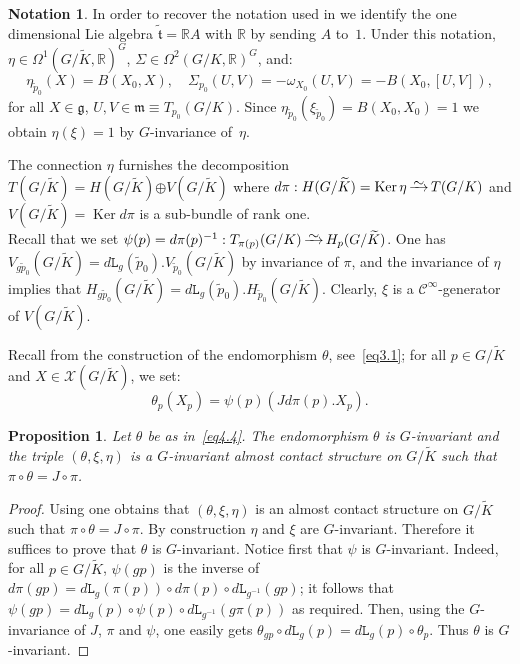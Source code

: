\documentclass[a4paper,reqno]{amsart}
\newtheorem{prop}[thm]{Proposition}
\theoremstyle{definition}
\newtheorem{Notation}[thm]{Notation}
\theoremstyle{remark}
\theoremstyle{plain}
\numberwithin{equation}{section}
\newcommand{\R}{{\mathbb{R}}}
\newcommand{\calX}{{\mathcal{X}}}
\newcommand{\calC}{{\mathcal{C}}}
\newcommand{\g}{{\mathfrak{g}}}  %
\newcommand{\fm}{{\mathfrak{m}}}
\def\preisomto{\vbox{\hbox to
               14pt{\hfill$\sim$\hfill}\nointerlineskip\vskip -0.2pt
               \hbox to 14pt{\rightarrowfill}}}
\def\isomto{\mathop{\preisomto}}
\def\Ker{\operatorname {Ker}}
\def\boplus{\mathbin{\boldsymbol{\oplus}}}
\newcommand{\Kt}{{\widetilde{K}}}
\newcommand{\wt}{{\widetilde{\mathfrak{t}}}}
\newcommand{\wpzero}{{\tilde{p}_0}}
\newcommand{\pzero}{{p_0}}
\newcommand{\ltr}{\mathtt{L}}
\newcommand{\ACS}{almost contact structure\xspace}
\newcommand{\txe}{{(\theta,\xi,\eta)}}
\begin{document}
 \begin{Notation}
   \label{not4.3}
   In order to recover the notation used in \cite{Hat, Mor1,
     Mor2, Ogi} %
   we identify the one dimensional Lie algebra $\wt= \R A$ with
   $\R$ by sending $A$ to~$1$. Under this notation,
   $\eta \in \Omega^1(G/\Kt,\R)^G$, $\Sigma \in \Omega^2(G/K,\R)^G$,
   and:
   \begin{equation*}
     \label{eq4.3}
     \eta_\wpzero(X)= B(X_0,X), \quad \Sigma_\pzero(U,V) =
     -\omega_{X_0}(U,V) = - B(X_0,[U,V]),
   \end{equation*}
   for all $X \in \g$, $U,V \in \fm \equiv T_\pzero (G/K)$.
     Since $\eta_\wpzero(\xi_\wpzero) = B(X_0,X_0) = 1$
   we obtain  $\eta(\xi)= 1$ by $G$-invariance of~$\eta$.
 \end{Notation}

 
 The connection $\eta$ furnishes the decomposition $T(G/\Kt)= H(G/\Kt) \boplus V(G/\Kt)$ where
 $d\pi : H(G/\Kt) = \Ker \eta \isomto T(G/K)$ and $V(G/\Kt)= \Ker d\pi$ is
 a sub-bundle of rank one.
 \\
 Recall that we set 
 $\psi(p) = d\pi(p)^{-1} : T_{\pi(p)}(G/K) \isomto H_p(G/\Kt)$. One has
 $V_{g\wpzero}(G/\Kt)= d\ltr_g(\wpzero). V_\wpzero (G/\Kt)$ by invariance
 of $\pi$, and the invariance of $\eta$ implies that
 $H_{g\wpzero}(G/\Kt) = d\ltr_g(\wpzero). H_\wpzero (G/\Kt)$.
Clearly, $\xi$ is a $\calC^\infty$-generator of $V(G/\Kt)$.
 
 
 Recall from \cite{Hat} the construction of the
 endomorphism $\theta$, see~\eqref{eq3.1}; 
 for all $p \in G/\Kt$ and $X \in \calX(G/\Kt)$, we set:
\begin{equation}
  \label{eq4.4}
  \theta_p(X_p) = \psi(p)(Jd\pi(p).X_p).%
\end{equation}

\begin{prop}
  \label{prop4.4}
  Let $\theta$ be as in~\eqref{eq4.4}. The
  endomorphism $\theta$ is $G$-invariant and the triple
  $\txe$ is a $G$-invariant \ACS on $G/\Kt$ such that $\pi \circ
  \theta = J \circ \pi$.
\end{prop}


\begin{proof}
Using \cite[\S 2, Theorem~1]{Hat} one obtains that $\txe$ is an
\ACS on $G/\Kt$ such that  $\pi \circ
  \theta = J \circ \pi$.
  By construction $\eta$ and $\xi$
  are $G$-invariant. Therefore it suffices to prove that
  $\theta$ is $G$-invariant.
 Notice first that $\psi$ is $G$-invariant. Indeed, for all
  $p \in G/\Kt$, $\psi({gp})$ is the inverse of $d\pi({gp}) = 
  d\ltr_g(\pi(p)) \circ d\pi(p) \circ d\ltr_{g^{-1}}(gp)$;
it follows that $\psi(gp)= d\ltr_g(p) \circ \psi(p) \circ
d\ltr_{g^{-1}}(g\pi(p))$ as required.   Then,
using the $G$-invariance of $J$, $\pi$ and $\psi$, 
one easily
gets $\theta_{gp}\circ d\ltr_g(p) = d\ltr_g(p) \circ \theta_p$. Thus $\theta$ is $G$-invariant.
\end{proof}
\end{document}
